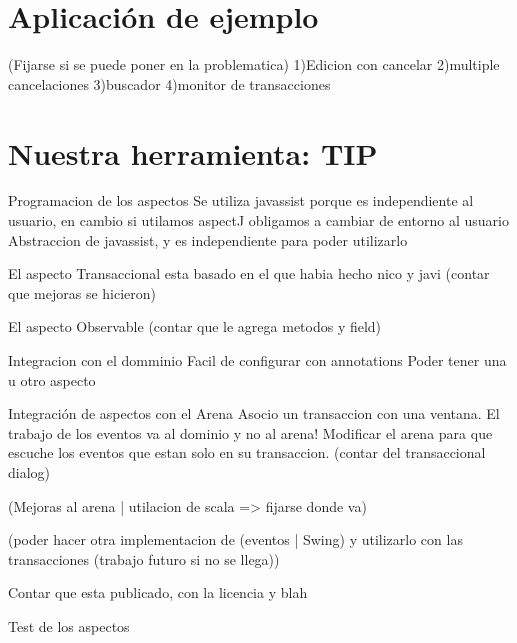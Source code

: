 \section{Aplicación de ejemplo}
(Fijarse si se puede poner en la problematica)
1)Edicion con cancelar
2)multiple cancelaciones
3)buscador
4)monitor de transacciones


\section{Nuestra herramienta: TIP}
\label{sec:Jeronimo}



Programacion de los aspectos 
	Se utiliza javassist porque es independiente al usuario, en cambio si utilamos
	aspectJ obligamos a cambiar de entorno al usuario
	Abstraccion de javassist, y es independiente para poder utilizarlo
	
	El aspecto Transaccional esta basado en el que habia hecho nico y javi (contar
	que mejoras se hicieron)
	
	El aspecto Observable (contar que le agrega metodos y field)


Integracion con el domminio
	Facil de configurar con annotations
	Poder tener una u otro aspecto 


Integración de aspectos con el Arena
	Asocio un transaccion con una ventana.
	El trabajo de los eventos va al dominio y no al arena!
	Modificar el arena para que escuche los eventos que estan solo en su
	transaccion. (contar del transaccional dialog)
	

(Mejoras al arena | utilacion de scala => fijarse donde va)
	
	
(poder hacer otra implementacion de (eventos | Swing) y utilizarlo con las
transacciones (trabajo futuro si no se llega))

Contar que esta publicado, con la licencia y blah

Test de los aspectos




